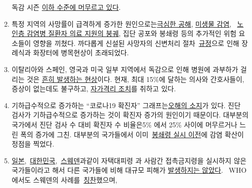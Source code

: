 \begin{enumerate}
  독감 시즌 \href{https://www.euromomo.eu/graphs-and-maps/}{이하 수준에
  머무르고 있다}.
\item
  특정 지역의 사망률이 급격하게 증가한
  원인으로는\href{https://www.theguardian.com/environment/2020/apr/20/air-pollution-may-be-key-contributor-to-covid-19-deaths-study?utm_medium}{극심한
  공해},
  \href{https://www.ansa.it/english/news/science_tecnology/2019/11/19/italy-top-in-eu-in-antibiotic-resistance_369e0123-0107-445e-8c17-f11932c9d27c.html}{미생물
  감염}, ~\href{https://swprs.org/covid-19-a-report-from-italy/}{노인층
  감염병 질환자 의료 지원의 붕궤}, 집단 공포와 봉쇄령 등의 추가적인 위험
  요소들이 영향을 끼쳤다. 까다롭게 신설된 사망자의 신변처리
  절차~\href{https://www.ecdc.europa.eu/sites/default/files/documents/COVID-19-safe-handling-of-bodies-or-persons-dying-from-COVID19.pdf}{규정}으로
  인해 장례식과 화장터에 병목현상이 초래되었다. 
\item
  이탈리아와 스페인, 영국과 미국 일부 지역에서 독감으로 인해 병원에
  과부하가 걸리는 것은
  \href{https://off-guardian.org/2020/04/02/coronavirus-fact-check-1-flu-doesnt-overwhelm-our-hospitals/}{흔히
  발생하는 현상}이다. 현재, 최대 15\%에 달하는 의사와 간호사들이, 증상이
  없는데도 불구하고,
  \href{https://www.reuters.com/article/us-health-coronavirus-spain-morgue-idUSKBN21B1PP}{자가격리
  조치}를 취하고 있다. 
\item
  기하급수적으로 증가하는 ``코로나19 확진자''
  그래프는\href{https://fivethirtyeight.com/features/coronavirus-case-counts-are-meaningless/}{오해의
  소지}가 있다. 진단 검사가 기하급수적으로 증가하는 것이 확진자 증가의
  원인이기 때문이다. 대부분의 국가에서 진단 검사 수 대비 확진자 수
  비율은5\% 에서 25\% 사이에 머무르거나 느린 폭의 증가에 그친. 대부분의
  국가들에서
  이미~\href{https://www.dailymail.co.uk/news/article-8235979/UKs-coronavirus-crisis-peaked-lockdown-Expert-argues-draconian-measures-unnecessary.html}{봉쇄령
  실시 이전}에 감염 확산이 정점을 찍었다. 
\item
  \href{https://www.japantimes.co.jp/news/2020/03/20/national/coronavirus-explosion-expected-japan/}{일본},~\href{https://www.businessinsider.com/south-korea-coronavirus-testing-death-rate-2020-3?op=1}{대한민국},~\href{https://www.youtube.com/watch?v=bfN2JWifLCY}{스웨덴}과같이
  자택대피령 과 사람간 접촉금지령을 실시하지 않은 국가들이라고 해서 다른
  국가들에 비해 대규모 피해가
  \href{https://www.washingtontimes.com/news/2020/apr/15/sweden-coronavirus-rates-easing-despite-loose-rule/}{발생하지는
  않았다}.~ WHO에서도 스웨덴의
  사례를~\href{https://nypost.com/2020/04/29/who-lauds-sweden-as-model-for-resisting-coronavirus-lockdown/}{칭찬}했으며,

\end{enumerate}

